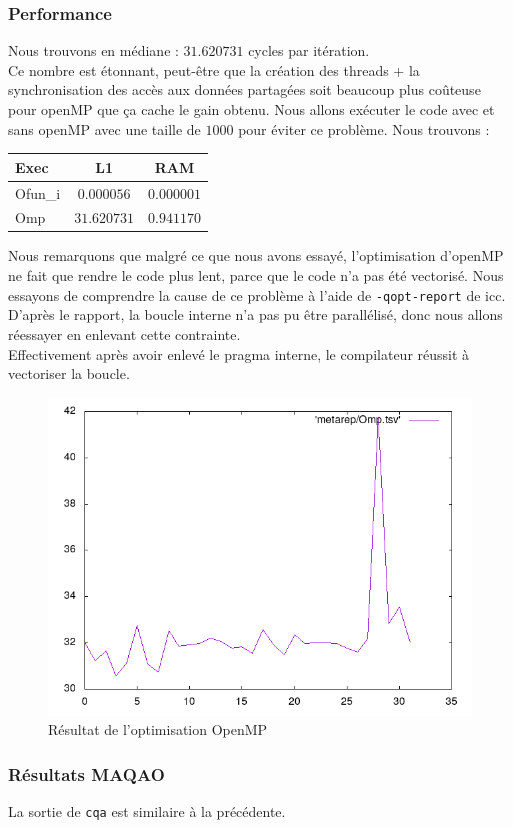\documentclass{report}
\begin{document}
  \subsubsection{Performance}
  Nous trouvons en médiane : $31.620731$ cycles par itération.\\
  Ce nombre est étonnant, peut-être que la création des threads + la synchronisation
  des accès aux données partagées soit beaucoup plus coûteuse pour openMP que ça cache le gain obtenu.
  Nous allons exécuter le code avec et sans openMP avec une taille de $1000$ pour éviter ce problème.
  Nous trouvons :
  \begin{center}
    \begin{tabular}{ | l | c | c | }
      \hline
      Exec    & L1          & RAM         \\ \hline
      Ofun\_i & $0.000056$  & $0.000001$  \\ \hline
      Omp     & $31.620731$ & $0.941170$  \\ \hline
    \end{tabular}
  \end{center}
  Nous remarquons que malgré ce que nous avons essayé, l'optimisation d'openMP ne fait que rendre
  le code plus lent, parce que le code n'a pas été vectorisé.
  Nous essayons de comprendre la cause de ce problème à l'aide de \texttt{-qopt-report} de icc.
  D'après le rapport, la boucle interne n'a pas pu être parallélisé, donc nous allons réessayer
  en enlevant cette contrainte.\\
  Effectivement après avoir enlevé le pragma interne, le compilateur réussit à vectoriser la boucle.
  \begin{figure}[ht!]
    \centering
    \includegraphics[scale=0.45]{../metarep/Omp.png}
    \caption{Résultat de l'optimisation OpenMP}
  \end{figure}
  \subsubsection{Résultats MAQAO}
  La sortie de \texttt{cqa} est similaire à la précédente.

\end{document}
